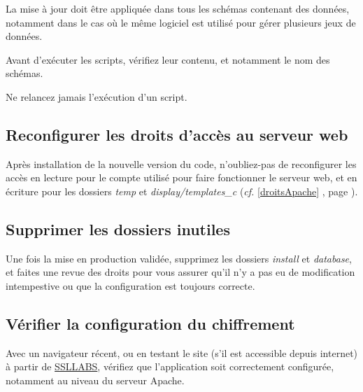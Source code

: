 La mise à jour doit être appliquée dans tous les schémas contenant des données, notamment dans le cas où le même logiciel est utilisé pour gérer plusieurs jeux de données.

Avant d'exécuter les scripts, vérifiez leur contenu, et notamment le nom des schémas.

Ne relancez jamais l'exécution d'un script.

\subsection{Reconfigurer les droits d'accès au serveur web}

Après installation de la nouvelle version du code, n'oubliez-pas de reconfigurer les accès en lecture pour le compte utilisé pour faire fonctionner le serveur web, et en écriture pour les dossiers \textit{temp} et \textit{display/templates\_c} (\textit{cf.} \ref{droitsApache} \textit{}, page \pageref{droitsApache}).

\subsection{Supprimer les dossiers inutiles}
Une fois la mise en production validée, supprimez les dossiers \textit{install} et \textit{database}, et faites une revue des droits pour vous assurer qu'il n'y a pas eu de modification intempestive ou que la configuration est toujours correcte.

\subsection{Vérifier la configuration du chiffrement}
Avec un navigateur récent, ou en testant le site (s'il est accessible depuis internet) à partir de \href{https://www.ssllabs.com/ssltest/}{SSLLABS}, vérifiez que l'application soit correctement configurée, notamment au niveau du serveur Apache.